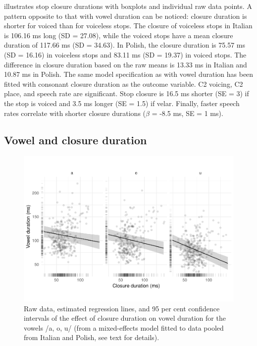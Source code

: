\documentclass[12pt,]{article}
\begin{document}
 illustrates stop closure durations with boxplots and
individual raw data points. A pattern opposite to that with vowel
duration can be noticed: closure duration is shorter for voiced than for
voiceless stops. The closure of voiceless stops in Italian is 106.16 ms
long (SD = 27.08), while the voiced stops have a mean closure duration
of 117.66 ms (SD = 34.63). In Polish, the closure duration is 75.57 ms
(SD = 16.16) in voiceless stops and 83.11 ms (SD = 19.37) in voiced
stops. The difference in closure duration based on the raw means is
13.33 ms in Italian and 10.87 ms in Polish. The same model specification
as with vowel duration has been fitted with consonant closure duration
as the outcome variable. C2 voicing, C2 place, and speech rate are
significant. Stop closure is 16.5 ms shorter (SE = 3) if the stop is
voiced and 3.5 ms longer (SE = 1.5) if velar. Finally, faster speech
rates correlate with shorter closure durations (\(\hat{\beta}\) = -8.5
ms, SE = 1 ms).

\hypertarget{vowel-and-closure-duration}{%
\subsection{Vowel and closure
duration}\label{vowel-and-closure-duration}}

\label{s:vcduration}

\begin{figure}
\includegraphics[width=\linewidth]{2018-relrel_files/figure-latex/Figure4} \caption{Raw data, estimated regression lines, and 95 per cent confidence intervals of the effect of closure duration on vowel duration for the vowels /a, o, u/ (from a mixed-effects model fitted to data pooled from Italian and Polish, see text for details).}\label{f:Figure4}
\end{figure}
\end{document}
